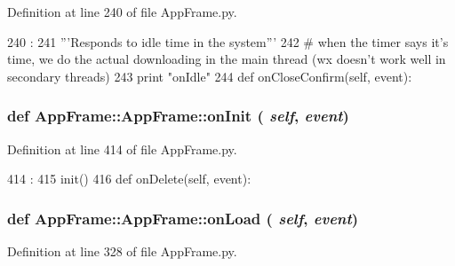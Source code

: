 Definition at line 240 of file AppFrame.py.


\begin{DoxyCode}
240                            :
241         '''Responds to idle time in the system'''
242         # when the timer says it's time, we do the actual downloading in the main
       thread (wx doesn't work well in secondary threads)
243         print "onIdle"
244         
    def onCloseConfirm(self, event):
\end{DoxyCode}
\hypertarget{classAppFrame_1_1AppFrame_a0f55c13ed518ba308a375dfc306fdee9}{
\subsubsection[{onInit}]{\setlength{\rightskip}{0pt plus 5cm}def AppFrame::AppFrame::onInit ( {\em self}, \/   {\em event})}}
\label{classAppFrame_1_1AppFrame_a0f55c13ed518ba308a375dfc306fdee9}


Definition at line 414 of file AppFrame.py.


\begin{DoxyCode}
414                            :
415         init()
416 
    def onDelete(self, event):
\end{DoxyCode}
\hypertarget{classAppFrame_1_1AppFrame_a6050b747faab481f9728a791ce5c8beb}{
\subsubsection[{onLoad}]{\setlength{\rightskip}{0pt plus 5cm}def AppFrame::AppFrame::onLoad ( {\em self}, \/   {\em event})}}
\label{classAppFrame_1_1AppFrame_a6050b747faab481f9728a791ce5c8beb}


Definition at line 328 of file AppFrame.py.


